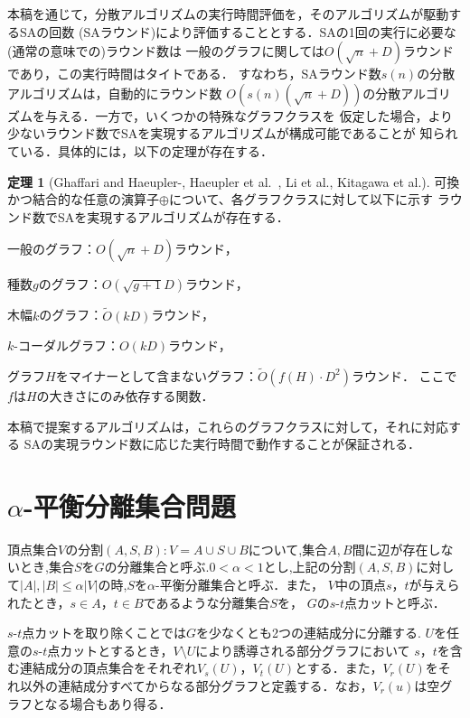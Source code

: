 \documentclass{thesis}
\theoremstyle{definition}
\newtheorem{theorem}{定理}
\begin{document}
本稿を通じて，分散アルゴリズムの実行時間評価を，そのアルゴリズムが駆動するSAの回数
(SAラウンド)により評価することとする．SAの1回の実行に必要な(通常の意味での)ラウンド数は
一般のグラフに関しては$O(\sqrt{n} + D)$ラウンドであり，この実行時間はタイトである．
すなわち，SAラウンド数$s(n)$の分散アルゴリズムは，自動的にラウンド数
$O(s(n)(\sqrt{n} + D))$の分散アルゴリズムを与える．一方で，いくつかの特殊なグラフクラスを
仮定した場合，より少ないラウンド数でSAを実現するアルゴリズムが構成可能であることが
知られている．具体的には，以下の定理が存在する．
\begin{theorem}[Ghaffari and Haeupler-\cite{ghaffari2016distributed}, Haeupler et al.~\cite{haeupler2016near}, Li et al.\cite{li2018distributed}, Kitagawa et al.\cite{北川大貴2019k}] \label{SA}
    可換かつ結合的な任意の演算子$\oplus$について、各グラフクラスに対して以下に示す
    ラウンド数でSAを実現するアルゴリズムが存在する．
    \item 一般のグラフ：$O(\sqrt{n} + D)$ラウンド，
    \item 種数$g$のグラフ：$O(\sqrt{g+1}D)$ラウンド，
    \item 木幅$k$のグラフ：$\tilde{O}(kD)$ラウンド，
    \item $k$-コーダルグラフ：$O(kD)$ラウンド，
    \item グラフ$H$をマイナーとして含まないグラフ：$\tilde{O}(f(H)\cdot D^2)$ラウンド．
    ここで$f$は$H$の大きさにのみ依存する関数．
\end{theorem}
本稿で提案するアルゴリズムは，これらのグラフクラスに対して，それに対応する
SAの実現ラウンド数に応じた実行時間で動作することが保証される．

\section{$\alpha$-平衡分離集合問題}
頂点集合$V$の分割$(A,S,B):V=A \cup S \cup B$について,集合$A,B$間に辺が存在しないとき,集合$S$を$G$の分離集合と呼ぶ.$0 < \alpha < 1$とし,上記の分割$(A,S,B)$に対して$|A|,|B|\leq \alpha|V|$の時,$S$を$\alpha$-平衡分離集合と呼ぶ．また，
$V$中の頂点$s$，$t$が与えられたとき，$s \in A$，$t \in B$であるような分離集合$S$を，
$G$の$s$-$t$点カットと呼ぶ．

$s$-$t$点カットを取り除くことでは$G$を少なくとも2つの連結成分に分離する.
$U$を任意の$s$-$t$点カットとするとき，$V \setminus U$により誘導される部分グラフにおいて
$s$，$t$を含む連結成分の頂点集合をそれぞれ$V_s(U)$，$V_t(U)$とする．また，$V_r(U)$をそれ以外の連結成分すべてからなる部分グラフと定義する．なお，$V_r(u)$は空グラフとなる場合もあり得る．
\end{document}
